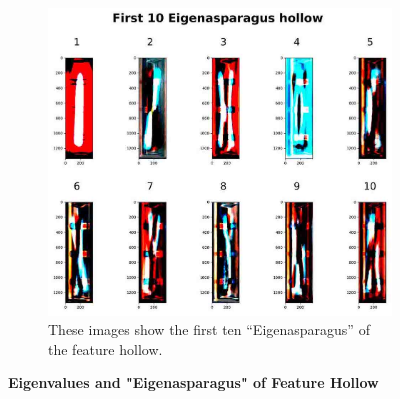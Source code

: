 \begin{figure}[H]
	\begin{subfigure}{0.9\textwidth}
		\includegraphics[width=0.9\linewidth]{Figures/chapter04/pca_hollow.png}
		\caption{These images show the first ten “Eigenasparagus” of the feature hollow.}
	\end{subfigure}
    \caption[First ten Eigenvalues and "Eigenasparagus" of Feature Hollow]{\textbf{Eigenvalues and "Eigenasparagus" of Feature Hollow}}
    \label{fig:PCAhollow}
\end{figure}



